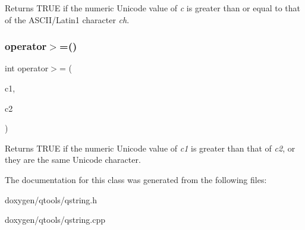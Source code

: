 Returns T\+R\+UE if the numeric Unicode value of {\itshape c} is greater than or equal to that of the A\+S\+C\+I\+I/\+Latin1 character {\itshape ch}. \mbox{\label{class_q_char_a4b5fd192cc790217e8be92350c712f96}} 
\subsubsection{\texorpdfstring{operator$>$=()}{operator>=()}\hspace{0.1cm}{\footnotesize\ttfamily [3/3]}}
{\footnotesize\ttfamily int operator$>$= (\begin{DoxyParamCaption}\item[{\mbox{\hyperlink{class_q_char}{Q\+Char}}}]{c1,  }\item[{\mbox{\hyperlink{class_q_char}{Q\+Char}}}]{c2 }\end{DoxyParamCaption})\hspace{0.3cm}{\ttfamily [related]}}

Returns T\+R\+UE if the numeric Unicode value of {\itshape c1} is greater than that of {\itshape c2}, or they are the same Unicode character. 

The documentation for this class was generated from the following files\+:\begin{DoxyCompactItemize}
\item 
doxygen/qtools/qstring.\+h\item 
doxygen/qtools/qstring.\+cpp\end{DoxyCompactItemize}
